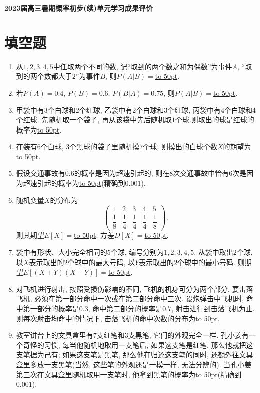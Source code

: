 \documentclass[10pt,a4paper]{article}
\newcommand{\blank}[1]{\underline{\hbox to #1pt{}}}
\begin{document}
\begin{center}
    {\Large \bf 2023届高三暑期概率初步(续)单元学习成果评价}
\end{center}

\section{填空题}

\begin{enumerate}[1.]

\item 从$1,2,3,4,5$中任取两个不同的数, 记``取到的两个数之和为偶数''为事件$A$, ``取到的两个数都大于$2$''为事件$B$, 则$P(A|B)=$\blank{50}.

\item 若$P(A)=0.4$, $P(B)=0.6$, $P(B|A)=0.75$, 则$P(A|B)=$\blank{50}.

\item 甲袋中有$3$个白球和$2$个红球, 乙袋中有$2$个白球和$3$个红球, 丙袋中有$4$个白球和$4$个红球. 先随机取一个袋子, 再从该袋中先后随机取$1$个球.则取出的球是红球的概率为\blank{50}.

\item 在装有$6$个白球, $3$个黑球的袋子里随机摸$7$个球, 则摸出的白球个数$X$的期望为\blank{50}.

\item 假设交通事故有$0.6$的概率是因为超速引起的, 则在$8$次交通事故中恰有$6$次是因为超速引起的概率为\blank{50}(精确到$0.001$).

 
\item 随机变量$X$的分布为
\[\begin{pmatrix} 1 & 2 & 3 & 4 & 5 \\ \dfrac 18 & \dfrac 14 & \dfrac 14 & \dfrac 14 & \dfrac 18\end{pmatrix},\]
则其期望$E[X]=$\blank{50}; 方差$D[X]=$\blank{50}.

\item 袋中有形状、大小完全相同的$5$个球, 编号分别为$1,2,3,4,5$. 从袋中取出$2$个球, 以$X$表示取出的$2$个球中的最大号码, 以$Y$表示取出的$2$个球中的最小号码. 则期望$E[(X+Y)(X-Y)]=$\blank{50}.

\item 对飞机进行射击, 按照受损伤影响的不同, 飞机的机身可分为两个部分. 要击落飞机, 必须在第一部分命中一次或在第二部分命中三次. 设炮弹击中飞机时, 命中第一部分的概率是$0.3$, 命中第二部分的概率是$0.7$, 射击进行到击落飞机为止. 则每次射击均命中的情况下, 击落飞机的命中次数的分布为\blank{50}.

\item 教室讲台上的文具盒里有$7$支红笔和$3$支黑笔, 它们的外观完全一样. 孔小姜有一个奇怪的习惯, 每当他随机地取用一支笔后, 如果这支笔是红笔, 那么他就把这支笔据为己有; 如果这支笔是黑笔, 那么他在归还这支笔的同时, 还额外往文具盒里多放一支黑笔(当然, 这些笔的外观还是一模一样, 无法分辨的). 当孔小姜第三次在文具盒里随机取用一支笔时, 他拿到黑笔的概率为\blank{50}(精确到$0.001$).

\end{enumerate}
\end{document}
